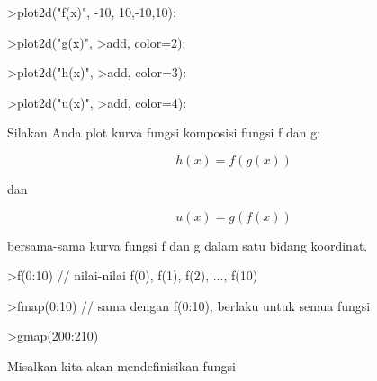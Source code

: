 \documentclass[a4paper,10pt]{article}
\begin{document}
\begin{eulernotebook}
\begin{eulerprompt}
>plot2d("f(x)", -10, 10,-10,10):
\end{eulerprompt}
\begin{eulerprompt}
>plot2d("g(x)", >add, color=2):
\end{eulerprompt}
\begin{eulerprompt}
>plot2d("h(x)", >add, color=3): 
\end{eulerprompt}
\begin{eulerprompt}
>plot2d("u(x)", >add, color=4):
\end{eulerprompt}
\begin{eulercomment}
Silakan Anda plot kurva fungsi komposisi fungsi f dan g:

\end{eulercomment}
\begin{eulerformula}
\[
h(x)=f(g(x))
\]
\end{eulerformula}
\begin{eulercomment}
dan

\end{eulercomment}
\begin{eulerformula}
\[
u(x)=g(f(x))
\]
\end{eulerformula}
\begin{eulercomment}
bersama-sama kurva fungsi f dan g dalam satu bidang koordinat.
\end{eulercomment}
\begin{eulerprompt}
>f(0:10) // nilai-nilai f(0), f(1), f(2), ..., f(10)
\end{eulerprompt}
\begin{euleroutput}
  [1,  4.31978,  10.4826,  19.1516,  32.4692,  50.3833,  72.7562,
  99.929,  130.69,  163.51,  200.58]
\end{euleroutput}
\begin{eulerprompt}
>fmap(0:10) // sama dengan f(0:10), berlaku untuk semua fungsi
\end{eulerprompt}
\begin{euleroutput}
  [1,  4.31978,  10.4826,  19.1516,  32.4692,  50.3833,  72.7562,
  99.929,  130.69,  163.51,  200.58]
\end{euleroutput}
\begin{eulerprompt}
>gmap(200:210)
\end{eulerprompt}
\begin{euleroutput}
  [0.987534,  0.987596,  0.987657,  0.987718,  0.987778,  0.987837,
  0.987896,  0.987954,  0.988012,  0.988069,  0.988126]
\end{euleroutput}
\begin{eulercomment}
Misalkan kita akan mendefinisikan fungsi


\end{eulercomment}
\end{eulernotebook}
\end{document}
